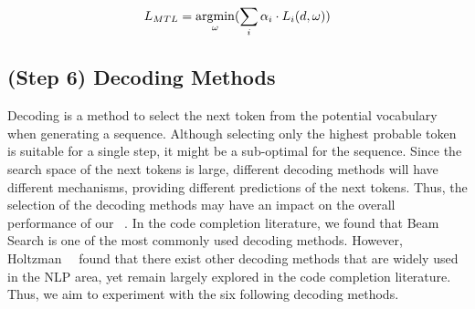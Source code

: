 \begin{equation}
    \label{eq:rq3}
    L_{MTL} = \argmin_{\omega}(\sum_{i}\alpha_i \cdot L_{i}(d, \omega))
\end{equation} 


\subsection{(Step 6) Decoding Methods}
\label{sec:approach-decoding}

Decoding is a method to select the next token from the potential vocabulary when generating a sequence.
Although selecting only the highest probable token is suitable for a single step, it might be a sub-optimal for the sequence.
Since the search space of the next tokens is large, different decoding methods will have different mechanisms, providing different predictions of the next tokens.
Thus, the selection of the decoding methods may have an impact on the overall performance of our ~\our.
In the code completion literature, we found that Beam Search is one of the most commonly used decoding methods.
However, Holtzman~\ea~\cite{holtzman2019curious} found that there exist other decoding methods that are widely used in the NLP area, yet remain largely explored in the code completion literature.
Thus, we aim to experiment with the six following decoding methods.




